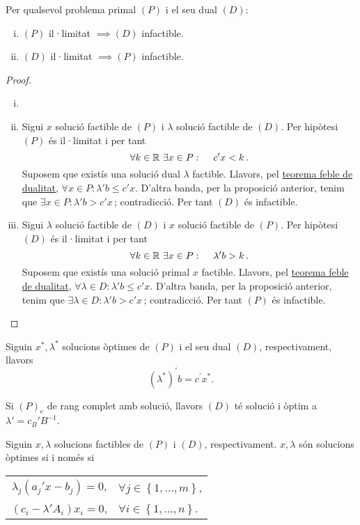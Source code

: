 \begin{col}
	Per qualsevol problema primal $(P)$ i el seu dual $(D)$: 
    \begin{enumerate}[i)]
        \item $\left(P\right)$ il·limitat $\implies \left(D\right)$ infactible.
        \item $\left(D\right)$ il·limitat $\implies \left(P\right)$ infactible.
    \end{enumerate}
	\begin{proof}
		\begin{enumerate}[i)]
			\item[]
			\item Sigui $x$ solució factible de $(P)$ i $\lambda$ solució factible de $(D)$. Per hipòtesi $(P)$ és il·limitat i per tant \[\forall k \in \mathbb{R}\ \exists x\in P\operatorname{\colon\quad} c'x < k\,. \] Suposem que existís una solució dual $\lambda$ factible. Llavors, pel \hyperref[teo:dualitat-feble]{teorema feble de dualitat}, $\forall x\in P\colon \lambda'b \le c'x$. D'altra banda, per la proposició anterior, tenim que $\exists x\in P\colon \lambda'b > c'x\,$; contradicció. Per tant $(D)$ és infactible.
			\item Sigui $\lambda$ solució factible de $(D)$ i $x$ solució factible de $(P)$. Per hipòtesi $(D)$ és il·limitat i per tant \[\forall k \in \mathbb{R}\ \exists x\in P\operatorname{\colon\quad} \lambda'b > k\,. \] Suposem que existís una solució primal $x$ factible. Llavors, pel \hyperref[teo:dualitat-feble]{teorema feble de dualitat}, $\forall \lambda\in D\colon \lambda'b \le c'x$. D'altra banda, per la proposició anterior, tenim que $\exists \lambda\in D\colon \lambda'b > c'x\,$; contradicció. Per tant $(P)$ és infactible.
		\end{enumerate}
	\end{proof}
\end{col}
\begin{teo}
    Siguin $x^*, \lambda^*$ solucions òptimes de $\left(P\right)$ i el seu dual $\left(D\right)$, respectivament, llavors
    \[ \left(\lambda^*\right)^\prime b = c^\prime x^*.\]
\end{teo}
\begin{col}
    Si $\left(P\right)_e$ de rang complet amb solució, llavors $\left(D\right)$ té solució i òptim a $\lambda' = c_B'B^{-1}$.
\end{col}
\begin{teo}
    Siguin $x, \lambda$ solucions factibles de $\left(P\right)$ i $\left(D\right)$, respectivament. $x, \lambda$ són solucions òptimes si i només si
    \begin{center}
        \begin{tabular}{cl}
            $\lambda_j \left(a_j'x - b_j\right) = 0$, & $\forall j \in \left\{1, \dots, m\right\}$, \\
            $\left(c_i - \lambda'A_i\right) x_i = 0$, & $\forall i \in \left\{1, \dots, n\right\}$.
        \end{tabular}
    \end{center}
\end{teo}
